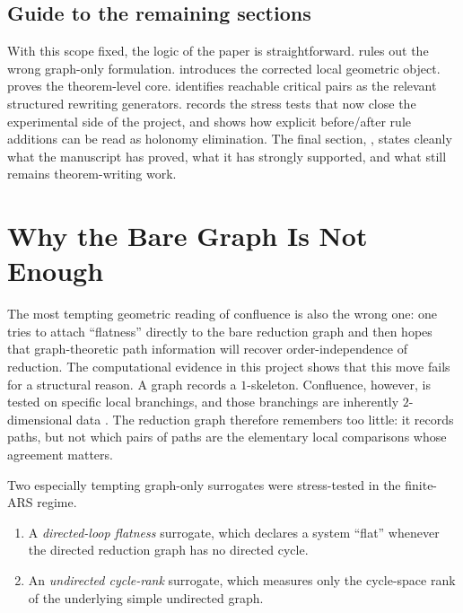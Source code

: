 \documentclass[11pt]{article}
\numberwithin{equation}{section}
\theoremstyle{definition}
\theoremstyle{remark}
\begin{document}
\subsection{Guide to the remaining sections}

With this scope fixed, the logic of the paper is straightforward.  rules out the wrong graph-only formulation.  introduces the corrected local geometric object.  proves the theorem-level core.  identifies reachable critical pairs as the relevant structured rewriting generators.  records the stress tests that now close the experimental side of the project, and  shows how explicit before/after rule additions can be read as holonomy elimination. The final section, , states cleanly what the manuscript has proved, what it has strongly supported, and what still remains theorem-writing work.
 \section{Why the Bare Graph Is Not Enough}
\label{sec:bare-graph-not-enough}

The most tempting geometric reading of confluence is also the wrong one: one tries to attach ``flatness'' directly to the bare reduction graph and then hopes that graph-theoretic path information will recover order-independence of reduction. The computational evidence in this project shows that this move fails for a structural reason. A graph records a $1$-skeleton. Confluence, however, is tested on specific local branchings, and those branchings are inherently $2$-dimensional data \cite{Huet1980,Terese2003,Mimram2023,GuiraudMalbos2012}. The reduction graph therefore remembers too little: it records paths, but not which pairs of paths are the elementary local comparisons whose agreement matters.

Two especially tempting graph-only surrogates were stress-tested in the finite-ARS regime.

\begin{enumerate}
    \item A \emph{directed-loop flatness} surrogate, which declares a system ``flat'' whenever the directed reduction graph has no directed cycle.
    \item An \emph{undirected cycle-rank} surrogate, which measures only the cycle-space rank of the underlying simple undirected graph.
\end{enumerate}
\end{document}
